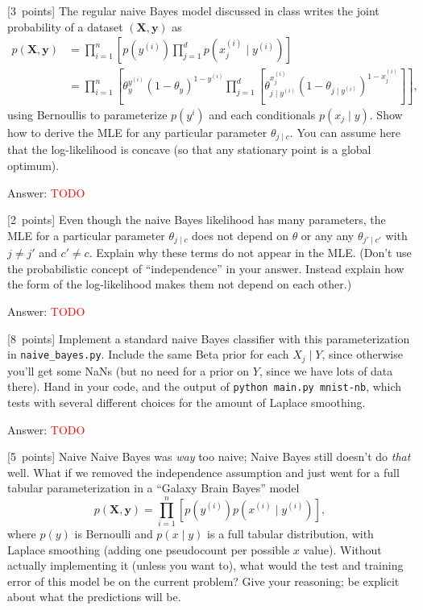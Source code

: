 \documentclass{article}
\newcommand{\ask}[1]{\textcolor{question}{#1}}
\newenvironment{answer}{\par\begingroup\color{answer}Answer: }{\endgroup}
\newcommand{\red}[1]{\textcolor{red}{#1}}
\newcommand{\pts}[1]{\textcolor{points}{[#1~points]}}
\newcommand{\TODO}{\red{TODO}}
\newcommand{\bX}{\mathbf{X}}
\newcommand{\by}{\mathbf{y}}
\newcommand{\toth}[1]{^{(#1)}}
\newcommand{\ith}{\toth{i}}
\begin{document}
\begin{qlist}
\item \pts{3}
    The regular naive Bayes model discussed in class writes the joint probability of a dataset $(\bX, \by)$ as
    \begin{align*}
       p(\bX, \by)
    &= \prod_{i=1}^n \left[p(y\ith) \prod_{j=1}^d p(x_j\ith \mid y\ith)\right]\\
    &= \prod_{i=1}^n \left[
            \theta_y^{y\ith} (1-\theta_y)^{1-y\ith}
            \prod_{j=1}^d \left[ \theta_{j \mid y\ith}^{x_j\ith} (1-\theta_{j \mid y\ith})^{1 - x_j\ith} \right]
       \right]
    ,\end{align*}
    using Bernoullis to parameterize $p(y^i)$ and each conditionals $p(x_j \mid y)$.
    \ask{Show how to derive the MLE for any particular parameter $\theta_{j \mid c}$.}
    You can assume here that the log-likelihood is concave (so that any stationary point is a global optimum).
\begin{answer}\TODO\end{answer}


\item \pts{2}
    Even though the naive Bayes likelihood has many parameters,
    the MLE for a particular parameter $\theta_{j\mid c}$ does not depend on $\theta$ or any any $\theta_{j'\mid c'}$ with $j\neq j'$ and $c' \neq c$.
    \ask{Explain why these terms do not appear in the MLE.}
    (Don't use the probabilistic concept of ``independence'' in your answer. Instead explain how the form of the log-likelihood makes them not depend on each other.)

\begin{answer}\TODO\end{answer}


\item \pts{8}
    Implement a standard naive Bayes classifier with this parameterization in \texttt{naive\_bayes.py}. 
    Include the same Beta prior for each $X_j \mid Y$, since otherwise you'll get some NaNs
    (but no need for a prior on $Y$, since we have lots of data there).
    \ask{Hand in your code, and the output of \texttt{python main.py mnist-nb}, which tests with several different choices for the amount of Laplace smoothing.}

\begin{answer}\TODO\end{answer}

\item \pts{5}
    Naive Naive Bayes was \emph{way} too naive;
    Naive Bayes still doesn't do \emph{that} well.
    What if we removed the independence assumption and just went for a full tabular parameterization in a ``Galaxy Brain Bayes'' model
    \[ p(\bX, \by) = \prod_{i=1}^n \left[ p(y\ith) p(x\ith \mid y\ith) \right] ,\]
    where $p(y)$ is Bernoulli and $p(x \mid y)$ is a full tabular distribution,
    with Laplace smoothing (adding one pseudocount per possible $x$ value).
    Without actually implementing it (unless you want to),
    \ask{what would the test and training error of this model be on the current problem?}
    Give your reasoning; be explicit about what the predictions will be.


\end{qlist}
\end{document}
